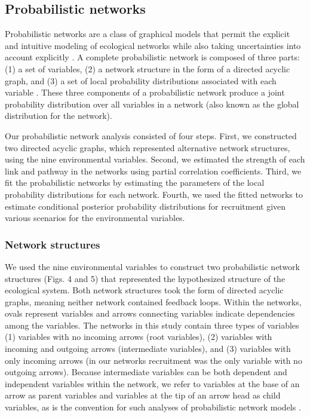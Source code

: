 \subsection{Probabilistic networks}

Probabilistic networks are a class of graphical models that permit the explicit
and intuitive modeling of ecological networks while also taking uncertainties
into account explicitly \citep{Pearl1988a, Varis1995a}. A complete probabilistic
network is composed of three parts: (1) a set of variables, (2) a network
structure in the form of a directed acyclic graph, and (3) a set of local
probability distributions associated with each variable \citep{Heckerman1996a}.
These three components of a probabilistic network produce a joint probability
distribution over all variables in a network (also known as the global
distribution for the network).

Our probabilistic network analysis consisted of four steps. First, we
constructed two directed acyclic graphs, which represented alternative network
structures, using the nine environmental variables. Second, we estimated the
strength of each link and pathway in the networks using partial correlation
coefficients. Third, we fit the probabilistic networks by estimating the
parameters of the local probability distributions for each network. Fourth, we
used the fitted networks to estimate conditional posterior probability
distributions for recruitment given various scenarios for the environmental
variables.


\subsubsection{Network structures}

We used the nine environmental variables to construct two probabilistic network
structures (Figs. 4 and 5) that represented the hypothesized structure of the
ecological system. Both network structures took the form of directed acyclic
graphs, meaning neither network contained feedback loops. Within the networks,
ovals represent variables and arrows connecting variables indicate dependencies
among the variables.  The networks in this study contain three types of
variables (1) variables with no incoming arrows (root variables), (2) variables
with incoming and outgoing arrows (intermediate variables), and (3) variables
with only incoming arrows (in our networks recruitment was the only variable
with no outgoing arrows). Because intermediate variables can be both dependent
and independent variables within the network, we refer to variables at the base
of an arrow as parent variables and variables at the tip of an arrow head as
child variables, as is the convention for such analyses of probabilistic network
models \citep{Koller2009a, Korb2004a}.

